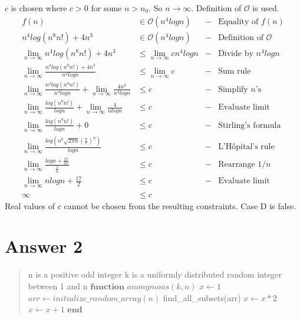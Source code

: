 \documentclass{article}
\begin{document}
$c$ is chosen where $c > 0$ for some $n > n_{0}$. So $n \to \infty$. Definition of $\mathcal{O}$ is used. 
\begingroup
\allowdisplaybreaks
\addtolength{\jot}{0.5em}
\begin{align*}
f(n) &\in \mathcal{O}(n^{4}log n) &-& \text{Equality of } f(n) \\
n^{4}log(n^{8}n!) + 4n^{3} &\in \mathcal{O}(n^{4}log n) &-& \text{Definition of } \mathcal{O} \\
\lim _{n \to \infty } n^{4}log(n^{8}n!) + 4n^{3} &\le \lim _{n \to \infty } c n^{4}log n &-& \text{Divide by } n^{4}log n \\
\lim _{n \to \infty } \frac{n^{4}log(n^{8}n!) + 4n^{3}} {n^{4}log n} &\le \lim _{n \to \infty } c &-& \text{Sum rule} \\
\lim _{n \to \infty } \frac{n^{4}log(n^{8}n!)} {n^{4}log n} + \lim _{n \to \infty } \frac{4n^{3}} {n^{4}log n} &\le c &-& \text{Simplify } n \text{'s} \\
\lim _{n \to \infty } \frac{log(n^{8}n!)} {log n} + \lim _{n \to \infty } \frac{4} {n log n} &\le c &-& \text{Evaluate limit} \\
\lim _{n \to \infty } \frac{log(n^{8}n!)} {log n} + 0 &\le c &-& \text{Stirling's formula} \\
\lim _{n \to \infty } \frac{log\left( n^{8}\sqrt{2\pi n}\left(\frac{n}{e}\right)^{n}\right)} {log n} &\le c &-& \text{L'Hôpital's rule} \\
\lim _{n \to \infty } \frac{log n + \frac{17}{2n}} {\frac{1} {n}} &\le c &-& \text{Rearrange } 1/n \\
\lim _{n \to \infty } n log n + \frac{17}{2} &\le c &-& \text{Evaluate limit} \\
\infty &\le c && 
\end{align*}
\endgroup
Real values of $c$ cannot be chosen from the resulting constraints. Case D is false. \\

\newpage
\section*{Answer 2}

\begin{quote}
\begin{algorithmic}[1]
\Require n is a positive odd integer
\Require k is a uniformly distributed random integer between 1 and n
\State $\textbf{function }anonymous(k,n)$
\State $x \gets 1$
\State $arr \gets initialize\_random\_array(n)$ 
        \State find\_all\_subsets(arr)
    \EndFor
{}
            \State $x \gets x * 2$
        \EndFor
    \EndFor 
\Else
        \State $x \gets x + 1$
    \EndFor
\EndIf 
\State $\textbf{end}$
\end{algorithmic}
\end{quote}
\end{document}
